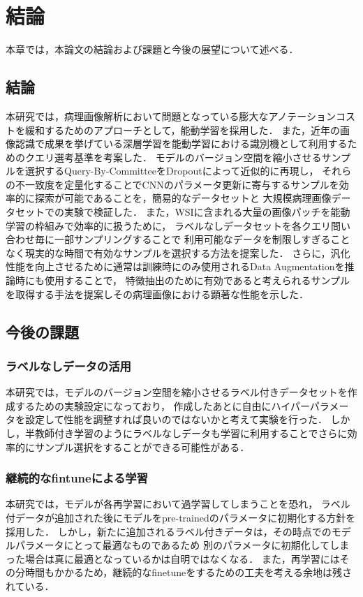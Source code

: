 \chapter{結論}
本章では，本論文の結論および課題と今後の展望について述べる．

\section{結論}
本研究では，病理画像解析において問題となっている膨大なアノテーションコストを緩和するためのアプローチとして，能動学習を採用した．
また，近年の画像認識で成果を挙げている深層学習を能動学習における識別機として利用するためのクエリ選考基準を考案した．
モデルのバージョン空間を縮小させるサンプルを選択するQuery-By-CommitteeをDropoutによって近似的に再現し，
それらの不一致度を定量化することでCNNのパラメータ更新に寄与するサンプルを効率的に探索が可能であることを，簡易的なデータセットと
大規模病理画像データセットでの実験で検証した．
また，WSIに含まれる大量の画像パッチを能動学習の枠組みで効率的に扱うために，
ラベルなしデータセットを各クエリ問い合わせ毎に一部サンプリングすることで
利用可能なデータを制限しすぎることなく現実的な時間で有効なサンプルを選択する方法を提案した．
さらに，汎化性能を向上させるために通常は訓練時にのみ使用されるData Augmentationを推論時にも使用することで，
特徴抽出のために有効であると考えられるサンプルを取得する手法を提案しその病理画像における顕著な性能を示した．


\section{今後の課題}

\subsection{ラベルなしデータの活用}
本研究では，モデルのバージョン空間を縮小させるラベル付きデータセットを作成するための実験設定になっており，
作成したあとに自由にハイパーパラメータを設定して性能を調整すれば良いのではないかと考えて実験を行った．
しかし，半教師付き学習のようにラベルなしデータも学習に利用することでさらに効率的にサンプル選択をすることができる可能性がある．

\subsection{継続的なfintuneによる学習}
本研究では，モデルが各再学習において過学習してしまうことを恐れ，
ラベル付データが追加された後にモデルをpre-trainedのパラメータに初期化する方針を採用した．
しかし，新たに追加されるラベル付きデータは，その時点でのモデルパラメータにとって最適なものであるため
別のパラメータに初期化してしまった場合は真に最適となっているかは自明ではなくなる．
また，再学習にはその分時間もかかるため，継続的なfinetuneをするための工夫を考える余地は残されている．
